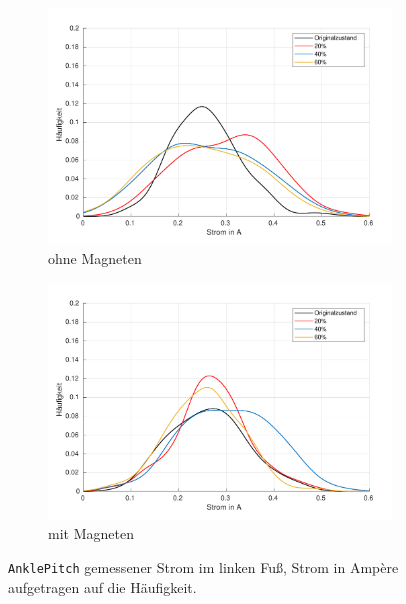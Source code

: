 \begin{figure}[tb]
	\centering
		\begin{subfigure}[c]{.9\linewidth}
			\centering
			\includegraphics[width=\linewidth]{Bilder/links_Current_AnklePitch_ohneM.pdf}
			\caption{ohne Magneten}
		\end{subfigure}
		\begin{subfigure}[c]{.9\linewidth}
			\centering
			\includegraphics[width=\linewidth]{Bilder/links_Current_AnklePitch_mitM.pdf}
			\caption{mit Magneten}
		\end{subfigure}
	\caption{\texttt{AnklePitch} gemessener Strom im linken Fuß, Strom in Ampère aufgetragen auf die Häufigkeit.} \label{AnklePitch_Current_links}
\end{figure}
